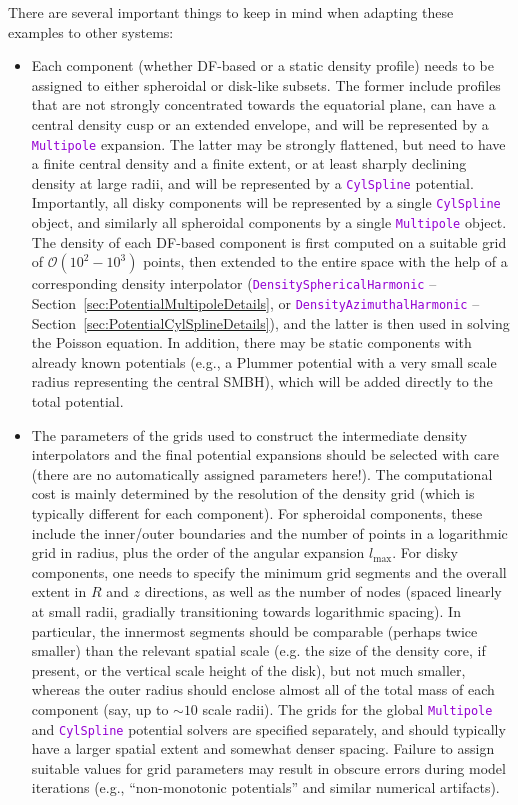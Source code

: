\documentclass[12pt]{article}
\newcommand{\ttt}[1]{\textcolor{darkviolet}{\texttt{#1}}}
\begin{document}
There are several important things to keep in mind when adapting these examples to other systems:
\begin{itemize}\item Each component (whether DF-based or a static density profile) needs to be assigned to either spheroidal or disk-like subsets. The former include profiles that are not strongly concentrated towards the equatorial plane, can have a central density cusp or an extended envelope, and will be represented by a \ttt{Multipole} expansion. The latter may be strongly flattened, but need to have a finite central density and a finite extent, or at least sharply declining density at large radii, and will be represented by a \ttt{CylSpline} potential. Importantly, all disky components will be represented by a single \ttt{CylSpline} object, and similarly all spheroidal components by a single \ttt{Multipole} object. The density of each DF-based component is first computed on a suitable grid of $\mathcal{O}(10^2-10^3)$ points, then extended to the entire space with the help of a corresponding density interpolator (\ttt{DensitySphericalHarmonic} -- Section~\ref{sec:PotentialMultipoleDetails}, or \ttt{DensityAzimuthalHarmonic} -- Section~\ref{sec:PotentialCylSplineDetails}), and the latter is then used in solving the Poisson equation. In addition, there may be static components with already known potentials (e.g., a Plummer potential with a very small scale radius representing the central SMBH), which will be added directly to the total potential.
\item The parameters of the grids used to construct the intermediate density interpolators and the final potential expansions should be selected with care (there are no automatically assigned parameters here!). The computational cost is mainly determined by the resolution of the density grid (which is typically different for each component). For spheroidal components, these include the inner/outer boundaries and the number of points in a logarithmic grid in radius, plus the order of the angular expansion $l_\mathrm{max}$. For disky components, one needs to specify the minimum grid segments and the overall extent in $R$ and $z$ directions, as well as the number of nodes (spaced linearly at small radii, gradially transitioning towards logarithmic spacing). In particular, the innermost segments should be comparable (perhaps twice smaller) than the relevant spatial scale (e.g. the size of the density core, if present, or the vertical scale height of the disk), but not much smaller, whereas the outer radius should enclose almost all of the total mass of each component (say, up to $\sim 10$ scale radii). The grids for the global \ttt{Multipole} and \ttt{CylSpline} potential solvers are specified separately, and should typically have a larger spatial extent and somewhat denser spacing. Failure to assign suitable values for grid parameters may result in obscure errors during model iterations (e.g., ``non-monotonic potentials'' and similar numerical artifacts).

\end{itemize}
\end{document}

